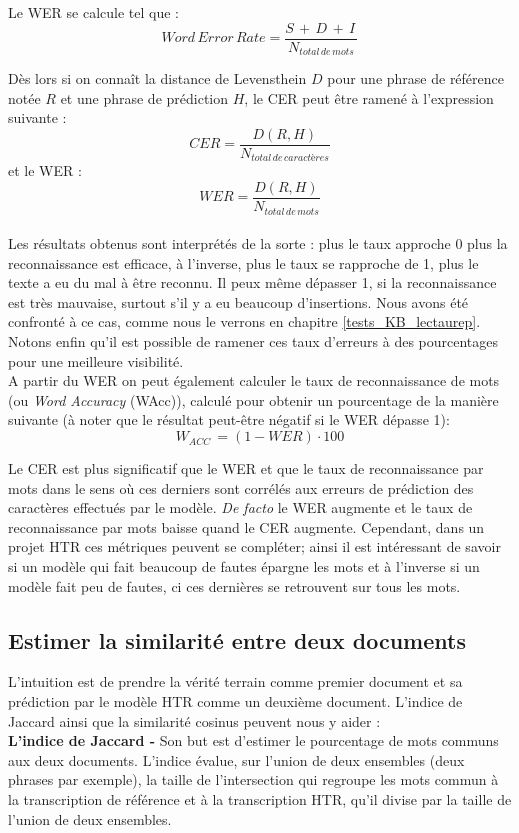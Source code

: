 Le WER se calcule tel que : $$ Word\, Error\, Rate = \frac{S\, + \,D\, + \,I\,}{N_{total\, de\, mots}} $$

Dès lors si on connaît la distance de Levensthein $D$ pour une phrase de référence notée $R$ et une phrase de prédiction $H$, le CER peut être ramené à l'expression suivante : $$CER = \frac{D(R,H)}{N_{total\, de\, caractères}}$$  et le WER :$$WER = \frac{D(R,H)}{N_{total\, de\, mots}}$$\\

Les résultats obtenus sont interprétés de la sorte : plus le taux approche 0 plus la reconnaissance est efficace, à l'inverse, plus le taux se rapproche de 1, plus le texte a eu du mal à être reconnu. Il peux même dépasser 1, si la reconnaissance est très mauvaise, surtout s'il y a eu beaucoup d'insertions. Nous avons été confronté à ce cas, comme nous le verrons en chapitre \ref{tests_KB_lectaurep}. Notons enfin qu'il est possible de ramener ces taux d'erreurs à des pourcentages pour une meilleure visibilité.\\
\newpage
A partir du WER on peut également calculer le taux de reconnaissance de mots (ou \textit{Word Accuracy} (WAcc)), calculé pour obtenir un pourcentage de la manière suivante (à noter que le résultat peut-être négatif si le WER dépasse 1): $$W_{ACC}\, = (1 - WER) \cdot 100  $$

Le CER est plus significatif que le WER et que le taux de reconnaissance par mots dans le sens où ces derniers sont corrélés aux erreurs de prédiction des caractères effectués par le modèle. \textit{De facto} le WER augmente et le taux de reconnaissance par mots baisse quand le CER augmente. Cependant, dans un projet HTR ces métriques peuvent se compléter; ainsi il est intéressant de savoir si un modèle qui fait beaucoup de fautes épargne les mots et à l'inverse si un modèle fait peu de fautes, ci ces dernières se retrouvent sur tous les mots.

\subsection{Estimer la similarité entre deux documents}

L'intuition est de prendre la vérité terrain comme premier document et sa prédiction par le modèle HTR comme un deuxième document. L'indice de Jaccard ainsi que la similarité cosinus peuvent nous y aider :\\

\textbf{L'indice de Jaccard -} Son but est d'estimer le pourcentage de mots communs aux deux documents. L'indice évalue, sur l'union de deux ensembles (deux phrases par exemple), la taille de l'intersection qui regroupe les mots commun à la transcription de référence et à la transcription HTR, qu'il divise par la taille de l'union de deux ensembles.

